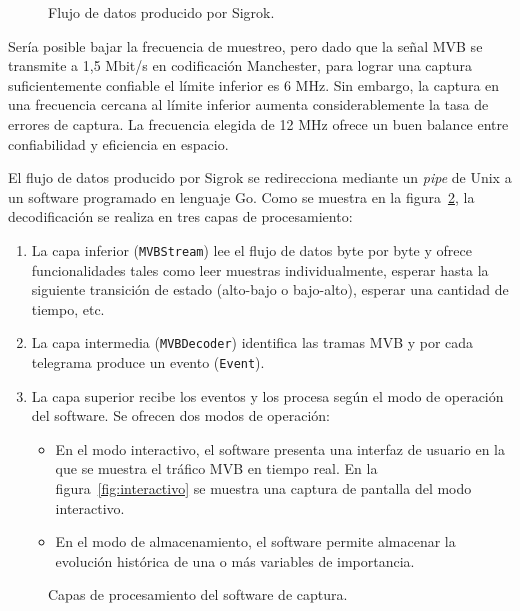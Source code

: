 \begin{figure}[htbp]
	\centering
    {
        \fontsize{9pt}{9pt}\selectfont
        
    }
	\caption{Flujo de datos producido por Sigrok.}
    \label{fig:sigrok}
\end{figure}

Sería posible bajar la frecuencia de muestreo, pero dado que la señal MVB se transmite a 1,5 Mbit/s en codificación Manchester, para lograr una captura suficientemente confiable el límite inferior es 6 MHz.
Sin embargo, la captura en una frecuencia cercana al límite inferior aumenta considerablemente la tasa de errores de captura.
La frecuencia elegida de 12 MHz ofrece un buen balance entre confiabilidad y eficiencia en espacio.

El flujo de datos producido por Sigrok se redirecciona mediante un \textit{pipe} de Unix a un software programado en lenguaje Go. Como se muestra en la figura~\ref{fig:capas-software}, la decodificación se realiza en tres capas de procesamiento:

\begin{enumerate}
\item La capa inferior (\texttt{MVBStream}) lee el flujo de datos byte por byte y ofrece funcionalidades tales como leer muestras individualmente, esperar hasta la siguiente transición de estado (alto-bajo o bajo-alto), esperar una cantidad de tiempo, etc.
\item La capa intermedia (\texttt{MVBDecoder}) identifica las tramas MVB y por cada telegrama produce un evento (\texttt{Event}).
\item La capa superior recibe los eventos y los procesa según el modo de operación del software. Se ofrecen dos modos de operación:
    \begin{itemize}
        \item En el modo interactivo, el software presenta una interfaz de usuario en la que se muestra el tráfico MVB en tiempo real. En la figura~\ref{fig:interactivo} se muestra una captura de pantalla del modo interactivo.
        \item En el modo de almacenamiento, el software permite almacenar la evolución histórica de una o más variables de importancia.
    \end{itemize}
\end{enumerate}

\begin{figure}[htbp]
	\centering
    {
        \fontsize{9pt}{9pt}\selectfont
        
    }
	\caption{Capas de procesamiento del software de captura.}
    \label{fig:capas-software}
\end{figure}

